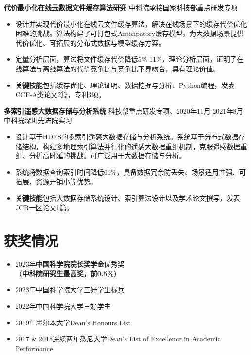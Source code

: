 \documentclass[UTF8,letterpaper,11pt]{article}
\begin{document}
\vspace{1pt}

\textbf{代价最小化在线云数据文件缓存算法研究} \hfill 中科院承接国家科技部重点研发专项

\begin{itemize}
  \setlength\itemsep{1.8pt}
  \item 设计并实现代价最小化在线云文件缓存算法，解决在线场景下的缓存代价优化困难的挑战。算法构建了可打包式Anticipatory缓存模型，为大数据场景提供代价优化、可拓展的分布式数据与模型缓存方案。
  \item 定量分析层面，算法将文件缓存代价降低5\%-11\%，理论分析层面，证明了在线算法与离线算法的代价竞争比与竞争比下界吻合，具有理论价值。
  \item \textbf{关键技能}包括缓存优化、理论证明、数据挖掘与分析、Python编程，发表CCF-A类论文2篇，专利3项。
\end{itemize}

\vspace{1pt}

\textbf{多索引遥感大数据存储与分析系统} \hfill 科技部重点研发专项、2020年11月-2021年8月中科院深圳先进院实习

\begin{itemize}
  \setlength\itemsep{1.8pt}
  \item 设计基于HDFS的多索引遥感大数据存储与分析系统。系统基于分布式数据存储结构，构建多地理索引算法并行化的遥感大数据重组机制，克服遥感数据重组、分析高时延的挑战。可广泛用于大数据存储与分析。
  \item 系统将数据查询索引时间降低60\%，具备数据冗余防丢失、场景适用性强、可拓展、资源开销小等优势。
  \item \textbf{关键技能}包括大数据存储系统设计、索引算法设计以及学术论文撰写，发表JCR一区论文1篇。
\end{itemize}




\section{\textbf{获奖情况}}
\vspace{-5mm}
\begin{multicols}{2}
\begin{itemize}
  \setlength\itemsep{1.8pt}
  \item 2023年\textbf{中国科学院院长奖学金}优秀奖\\（\textbf{中科院研究生最高奖，前0.5\%}）
  \item 2023年中国科学院大学三好学生标兵
  \item 2022年中国科学院大学三好学生
  \item 2019年墨尔本大学Dean's Honours List
  \item 2017 \& 2018连续两年悉尼大学Dean's List of Excellence in Academic Performance
\end{itemize}
\end{multicols}
\end{document}

